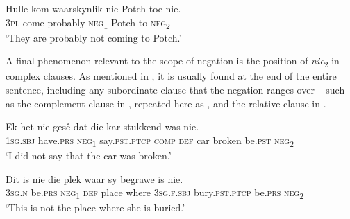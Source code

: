 \documentclass[output=paper,colorlinks,citecolor=brown]{langscibook}
\begin{document}
    \ex\label{ex:afr:35c}
        \gll  Hulle kom waarskynlik nie Potch toe nie. \\ 
             \textsc{3pl} come probably \textsc{neg}\textsubscript{1}  Potch to \textsc{neg}\textsubscript{2} \\
        \glt ‘They are probably not coming to Potch.’
    \z
\z 

A final phenomenon relevant to the scope of negation is the position of \textit{nie}\textsubscript{2} in complex clauses. As mentioned in , it is usually found at the end of the entire sentence, including any subordinate clause that the negation ranges over – such as the complement clause in , repeated here as , and the relative clause in .

\ea\label{ex:afr:36}
    \ea\label{ex:afr:36a}
        \gll Ek het nie gesê dat die kar stukkend was nie. \\ 
             \textsc{1sg.sbj} have.\textsc{prs} \textsc{neg}\textsubscript{1} say.\textsc{pst.ptcp} \textsc{comp}  \textsc{def} car broken be.\textsc{pst} \textsc{neg}\textsubscript{2} \\
        \glt ‘I did not say that the car was broken.’
    
    \ex\label{ex:afr:36b}
        \gll Dit is nie die plek waar sy begrawe is nie. \\
             \textsc{3sg.n} be.\textsc{prs} \textsc{neg}\textsubscript{1}  \textsc{def} place  where  \textsc{3sg.f.sbj} bury.\textsc{pst.ptcp} be.\textsc{prs}  \textsc{neg}\textsubscript{2}\\
        \glt ‘This is not the place where she is buried.’
    \z
\z 
\end{document}

